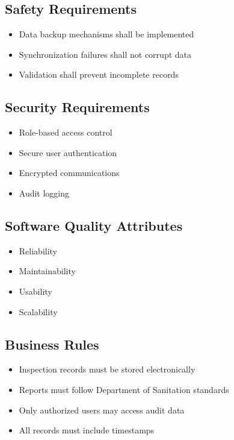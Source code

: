 \documentclass[12pt]{article}
\begin{document}
\subsection{Safety Requirements}

\begin{itemize}
\item Data backup mechanisms shall be implemented
\item Synchronization failures shall not corrupt data
\item Validation shall prevent incomplete records
\end{itemize}

\subsection{Security Requirements}

\begin{itemize}
\item Role-based access control
\item Secure user authentication
\item Encrypted communications
\item Audit logging
\end{itemize}

\subsection{Software Quality Attributes}

\begin{itemize}
\item Reliability
\item Maintainability
\item Usability
\item Scalability
\end{itemize}

\subsection{Business Rules}

\begin{itemize}
\item Inspection records must be stored electronically
\item Reports must follow Department of Sanitation standards
\item Only authorized users may access audit data
\item All records must include timestamps
\end{itemize}
\end{document}
